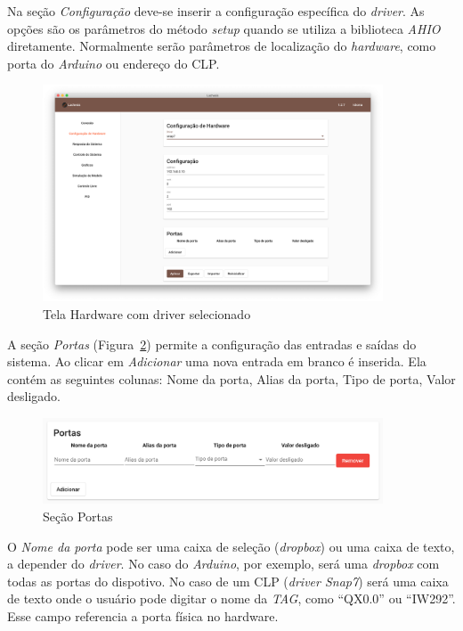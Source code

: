 Na seção \textit{Configuração} deve-se inserir a configuração específica do
\textit{driver}. As opções são os parâmetros do método \textit{setup} quando se
utiliza a biblioteca \textit{AHIO} diretamente. Normalmente serão parâmetros de
localização do \textit{hardware}, como porta do \textit{Arduino} ou endereço do
CLP\@.

\begin{figure}[ht!]
    \centering
    \includegraphics[width=0.9\textwidth]{imgs/hardware2}
    \caption[Tela Hardware com driver selecionado]{Tela Hardware com driver selecionado}%
    \label{fig:hardware2}
\end{figure}

A seção \textit{Portas} (Figura~\ref{fig:hardware3}) permite a configuração das
entradas e saídas do sistema. Ao clicar em \textit{Adicionar} uma nova entrada
em branco é inserida. Ela contém as seguintes colunas: Nome da porta, Alias da
porta, Tipo de porta, Valor desligado.

\begin{figure}[ht!]
    \centering
    \includegraphics[width=0.9\textwidth]{imgs/hardware3}
    \caption[Seção Portas]{Seção Portas}%
    \label{fig:hardware3}
\end{figure}

O \textit{Nome da porta} pode ser uma caixa de seleção (\textit{dropbox}) ou uma
caixa de texto, a depender do \textit{driver}. No caso do \textit{Arduino}, por
exemplo, será uma \textit{dropbox} com todas as portas do dispotivo. No caso de
um CLP (\textit{driver Snap7}) será uma caixa de texto onde o usuário pode
digitar o nome da \textit{TAG}, como \enquote{QX0.0} ou \enquote{IW292}. Esse
campo referencia a porta física no hardware.

